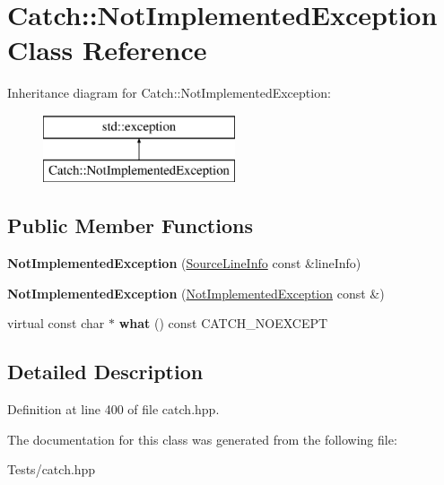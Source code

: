 \hypertarget{class_catch_1_1_not_implemented_exception}{}\section{Catch\+:\+:Not\+Implemented\+Exception Class Reference}
\label{class_catch_1_1_not_implemented_exception}
Inheritance diagram for Catch\+:\+:Not\+Implemented\+Exception\+:\begin{figure}[H]
\begin{center}
\leavevmode
\includegraphics[height=2.000000cm]{class_catch_1_1_not_implemented_exception}
\end{center}
\end{figure}
\subsection*{Public Member Functions}
\begin{DoxyCompactItemize}
\item 
\mbox{\label{class_catch_1_1_not_implemented_exception_ab4f0a5c39d8ffb72c664e2c07e180634}} 
{\bfseries Not\+Implemented\+Exception} (\hyperlink{struct_catch_1_1_source_line_info}{Source\+Line\+Info} const \&line\+Info)
\item 
\mbox{\label{class_catch_1_1_not_implemented_exception_a508a7a833455da2d3c10ea1a9d45e982}} 
{\bfseries Not\+Implemented\+Exception} (\hyperlink{class_catch_1_1_not_implemented_exception}{Not\+Implemented\+Exception} const \&)
\item 
\mbox{\label{class_catch_1_1_not_implemented_exception_ad4c13963f1a8feacda0cd331adda89e3}} 
virtual const char $\ast$ {\bfseries what} () const C\+A\+T\+C\+H\+\_\+\+N\+O\+E\+X\+C\+E\+PT
\end{DoxyCompactItemize}


\subsection{Detailed Description}


Definition at line 400 of file catch.\+hpp.



The documentation for this class was generated from the following file\+:\begin{DoxyCompactItemize}
\item 
Tests/catch.\+hpp\end{DoxyCompactItemize}
